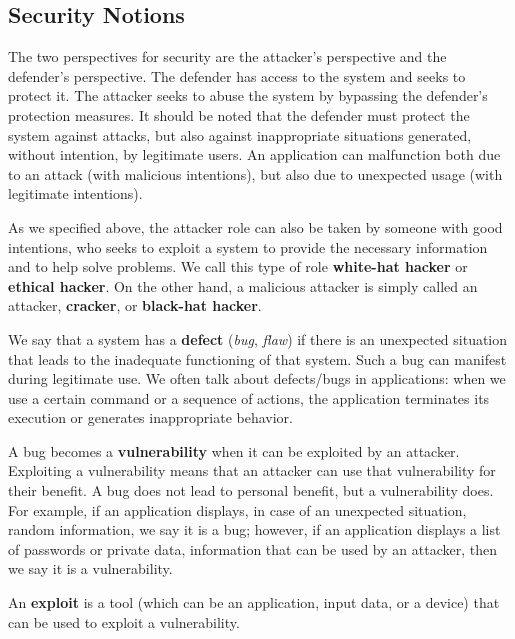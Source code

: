 \subsection{Security Notions}
\label{sec:sec:fundamentals:notions}

The two perspectives for security are the attacker's perspective and the defender's perspective.
The defender has access to the system and seeks to protect it.
The attacker seeks to abuse the system by bypassing the defender's protection measures.
It should be noted that the defender must protect the system against attacks, but also against inappropriate situations generated, without intention, by legitimate users.
An application can malfunction both due to an attack (with malicious intentions), but also due to unexpected usage (with legitimate intentions).

As we specified above, the attacker role can also be taken by someone with good intentions, who seeks to exploit a system to provide the necessary information and to help solve problems.
We call this type of role \textbf{white-hat hacker} or \textbf{ethical hacker}.
On the other hand, a malicious attacker is simply called an attacker, \textbf{cracker}, or \textbf{black-hat hacker}.

We say that a system has a \textbf{defect} (\textit{bug}, \textit{flaw}) if there is an unexpected situation that leads to the inadequate functioning of that system.
Such a bug can manifest during legitimate use.
We often talk about defects/bugs in applications: when we use a certain command or a sequence of actions, the application terminates its execution or generates inappropriate behavior.

A bug becomes a \textbf{vulnerability} when it can be exploited by an attacker.
Exploiting a vulnerability means that an attacker can use that vulnerability for their benefit.
A bug does not lead to personal benefit, but a vulnerability does.
For example, if an application displays, in case of an unexpected situation, random information, we say it is a bug;
however, if an application displays a list of passwords or private data, information that can be used by an attacker, then we say it is a vulnerability.

An \textbf{exploit} is a tool (which can be an application, input data, or a device) that can be used to exploit a vulnerability.

